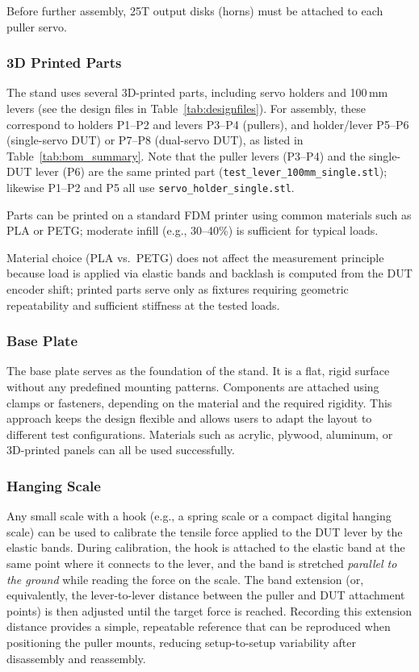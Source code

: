 \documentclass[11pt,letterpaper]{article}
\begin{document}
Before further assembly, 25T output disks (horns) must be attached to each puller servo.

\subsubsection{3D Printed Parts}
\label{subsubsec:printed-parts}

The stand uses several 3D-printed parts, including servo holders and 100\,mm levers (see the design files in Table~\ref{tab:designfiles}). For assembly, these correspond to holders P1--P2 and levers P3--P4 (pullers), and holder/lever P5--P6 (single-servo DUT) or P7--P8 (dual-servo DUT), as listed in Table~\ref{tab:bom_summary}. Note that the puller levers (P3--P4) and the single-DUT lever (P6) are the same printed part (\texttt{test\_lever\_100mm\_single.stl}); likewise P1--P2 and P5 all use \texttt{servo\_holder\_single.stl}.

Parts can be printed on a standard FDM printer using common materials such as PLA or PETG; moderate infill (e.g., 30--40\%) is sufficient for typical loads.

Material choice (PLA vs.\ PETG) does not affect the measurement principle because load is applied via elastic bands and
backlash is computed from the DUT encoder shift; printed parts serve only as fixtures requiring geometric repeatability and sufficient stiffness at the tested loads.

\subsubsection{Base Plate}
\label{subsubsec:base-plate}

The base plate serves as the foundation of the stand. It is a flat, rigid surface without any predefined mounting patterns. Components are attached using clamps or fasteners, depending on the material and the required rigidity. This approach keeps the design flexible and allows users to adapt the layout to different test configurations. Materials such as acrylic, plywood, aluminum, or 3D-printed panels can all be used successfully.

\subsubsection{Hanging Scale}
\label{subsubsec:hanging-scale}

Any small scale with a hook (e.g., a spring scale or a compact digital hanging scale) can be used to calibrate the tensile force applied to the DUT lever by the elastic bands. During calibration, the hook is attached to the elastic band at the same point where it connects to the lever, and the band is stretched \emph{parallel to the ground} while reading the force on the scale. The band extension (or, equivalently, the lever-to-lever distance between the puller and DUT attachment points) is then adjusted until the target force is reached. Recording this extension distance provides a simple, repeatable reference that can be reproduced when positioning the puller mounts, reducing setup-to-setup variability after disassembly and reassembly.
\end{document}
